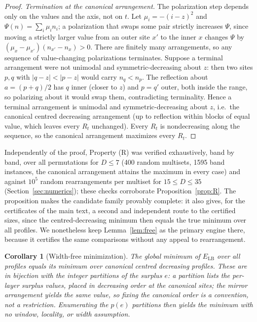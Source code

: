 \documentclass[11pt]{article}
\newtheorem{corollary}{Corollary}
\theoremstyle{remark}
\newcommand{\LB}{\mathrm{LB}}
\begin{document}
\begin{proof}
\emph{Termination at the canonical arrangement.} The polarization step depends only on the values and the axis, not on $t$. Let $\mu_i=-(i-z)^2$ and $\Psi(n)=\sum_i \mu_i n_i$; a polarization that swaps some pair strictly increases $\Psi$, since moving a strictly larger value from an outer site $x'$ to the inner $x$ changes $\Psi$ by $(\mu_x-\mu_{x'})(n_{x'}-n_x)>0$. There are finitely many arrangements, so any sequence of value-changing polarizations terminates. Suppose a terminal arrangement were not unimodal and symmetric-decreasing about $z$: then two sites $p,q$ with $|q-z|<|p-z|$ would carry $n_q<n_p$. The reflection about $a=(p+q)/2$ has $q$ inner (closer to $z$) and $p=q'$ outer, both inside the range, so polarizing about it would swap them, contradicting terminality. Hence a terminal arrangement is unimodal and symmetric-decreasing about $z$, i.e.\ the canonical centred decreasing arrangement (up to reflection within blocks of equal value, which leaves every $R_t$ unchanged). Every $R_t$ is nondecreasing along the sequence, so the canonical arrangement maximizes every $R_t$.
\end{proof}

Independently of the proof, Property (R) was verified exhaustively, band by band, over all permutations for $D\le7$ (400 random multisets, 1595 band instances, the canonical arrangement attains the maximum in every case) and against $10^5$ random rearrangements per multiset for $15\le D\le35$ (Section~\ref{sec:numerics}); these checks corroborate Proposition~\ref{prop:R}. The proposition makes the candidate family provably complete: it also gives, for the certificates of the main text, a second and independent route to the certified sizes, since the centred-decreasing minimum then equals the true minimum over all profiles. We nonetheless keep Lemma~\ref{lem:free} as the primary engine there, because it certifies the same comparisons without any appeal to rearrangement.

\begin{corollary}[Width-free minimization]\label{cor:width}
The global minimum of $E_\LB$ over all profiles equals its minimum over canonical centred decreasing profiles. These are in bijection with the integer partitions of the surplus $e$: a partition lists the per-layer surplus values, placed in decreasing order at the canonical sites; the mirror arrangement yields the same value, so fixing the canonical order is a convention, not a restriction. Enumerating the $p(e)$ partitions then yields the minimum with no window, locality, or width assumption.
\end{corollary}
\end{document}
